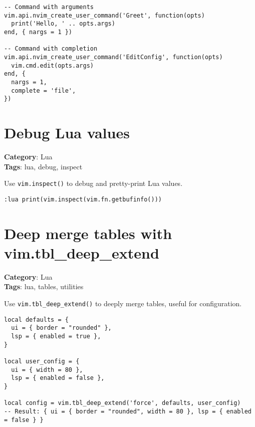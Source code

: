 {{{{{{\begin{Exa*}{}
\begin{Verbatim}[fontsize=\footnotesize, breaklines, breakanywhere]
-- Command with arguments
vim.api.nvim_create_user_command('Greet', function(opts)
  print('Hello, ' .. opts.args)
end, { nargs = 1 })

-- Command with completion
vim.api.nvim_create_user_command('EditConfig', function(opts)
  vim.cmd.edit(opts.args)
end, {
  nargs = 1,
  complete = 'file',
})
\end{Verbatim}
\end{Exa*}

\section{Debug Lua values}

\textbf{Category}: Lua\\ \textbf{Tags}: lua, debug, inspect
\vspace{0.5cm}

Use {\footnotesize \Verb§vim.inspect()§} to debug and pretty-print Lua values.

\begin{Exa*}{}
\begin{Verbatim}[fontsize=\footnotesize, breaklines, breakanywhere]
:lua print(vim.inspect(vim.fn.getbufinfo()))
\end{Verbatim}
\end{Exa*}

\section{Deep merge tables with vim.tbl\_deep\_extend}

\textbf{Category}: Lua\\ \textbf{Tags}: lua, tables, utilities
\vspace{0.5cm}

Use {\footnotesize \Verb§vim.tbl_deep_extend()§} to deeply merge tables, useful for configuration.

\begin{Exa*}{}
\begin{Verbatim}[fontsize=\footnotesize, breaklines, breakanywhere]
local defaults = {
  ui = { border = "rounded" },
  lsp = { enabled = true },
}

local user_config = {
  ui = { width = 80 },
  lsp = { enabled = false },
}

local config = vim.tbl_deep_extend('force', defaults, user_config)
-- Result: { ui = { border = "rounded", width = 80 }, lsp = { enabled = false } }
\end{Verbatim}
\end{Exa*}

}}}}}}
